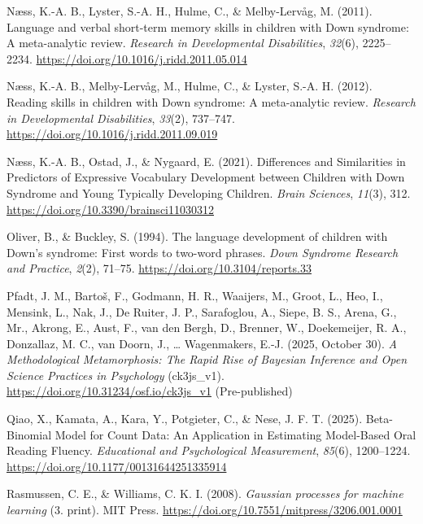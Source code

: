 \documentclass[
  11pt,
  a4paper,
]{report}
\newlength{\cslhangindent}
\newenvironment{CSLReferences}[2] %
 {\begin{list}{}{%
  \setlength{\itemindent}{0pt}
  \setlength{\leftmargin}{0pt}
  \setlength{\parsep}{0pt}
  \ifodd #1
   \setlength{\leftmargin}{\cslhangindent}
   \setlength{\itemindent}{-1\cslhangindent}
  \fi
  \setlength{\itemsep}{#2\baselineskip}}}
 {\end{list}}
\begin{document}
\begin{CSLReferences}{1}{0}
Næss, K.-A. B., Lyster, S.-A. H., Hulme, C., \& Melby-Lervåg, M. (2011).
Language and verbal short-term memory skills in children with {Down}
syndrome: {A} meta-analytic review. \emph{Research in Developmental
Disabilities}, \emph{32}(6), 2225--2234.
\url{https://doi.org/10.1016/j.ridd.2011.05.014}

Næss, K.-A. B., Melby-Lervåg, M., Hulme, C., \& Lyster, S.-A. H. (2012).
Reading skills in children with {Down} syndrome: A meta-analytic review.
\emph{Research in Developmental Disabilities}, \emph{33}(2), 737--747.
\url{https://doi.org/10.1016/j.ridd.2011.09.019}

Næss, K.-A. B., Ostad, J., \& Nygaard, E. (2021). Differences and
{Similarities} in {Predictors} of {Expressive Vocabulary Development}
between {Children} with {Down Syndrome} and {Young Typically Developing
Children}. \emph{Brain Sciences}, \emph{11}(3), 312.
\url{https://doi.org/10.3390/brainsci11030312}

Oliver, B., \& Buckley, S. (1994). The language development of children
with {Down}'s syndrome: {First} words to two-word phrases. \emph{Down
Syndrome Research and Practice}, \emph{2}(2), 71--75.
\url{https://doi.org/10.3104/reports.33}

Pfadt, J. M., Bartoš, F., Godmann, H. R., Waaijers, M., Groot, L., Heo,
I., Mensink, L., Nak, J., De Ruiter, J. P., Sarafoglou, A., Siepe, B.
S., Arena, G., Mr., Akrong, E., Aust, F., van den Bergh, D., Brenner,
W., Doekemeijer, R. A., Donzallaz, M. C., van Doorn, J., \ldots{}
Wagenmakers, E.-J. (2025, October 30). \emph{A {Methodological
Metamorphosis}: {The Rapid Rise} of {Bayesian Inference} and {Open
Science Practices} in {Psychology}} (ck3js\_v1).
\url{https://doi.org/10.31234/osf.io/ck3js_v1} (Pre-published)

Qiao, X., Kamata, A., Kara, Y., Potgieter, C., \& Nese, J. F. T. (2025).
Beta-{Binomial Model} for {Count Data}: {An Application} in {Estimating
Model-Based Oral Reading Fluency}. \emph{Educational and Psychological
Measurement}, \emph{85}(6), 1200--1224.
\url{https://doi.org/10.1177/00131644251335914}

Rasmussen, C. E., \& Williams, C. K. I. (2008). \emph{Gaussian processes
for machine learning} (3. print). MIT Press.
\url{https://doi.org/10.7551/mitpress/3206.001.0001}


\end{CSLReferences}
\end{document}
